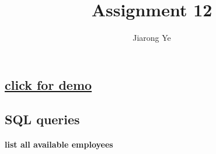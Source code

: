 \documentclass[11pt]{article}
\title{Assignment 12}
\author{Jiarong Ye}
\begin{document}
    
    
    \maketitle
    
    
\subsection*{\texorpdfstring{ \href{http://cs431project-jxy225.herokuapp.com/view/schedule_emptype_display.php}{click for
			demo}}{test cases (click for demo)}}\label{test-cases-click-for-demo}
    
    \subsection*{SQL queries}\label{sql-queries}

    \paragraph{list all available
employees}\label{list-all-available-employees}
\end{document}
